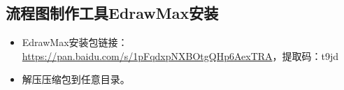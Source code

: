 \subsection{流程图制作工具EdrawMax安装}
\begin{itemize}
\item EdrawMax安装包链接：\url{https://pan.baidu.com/s/1pFqdxpNXBOtgQHp6AexTRA}，提取码：t9jd 
\item 解压压缩包到任意目录。
\end{itemize}

